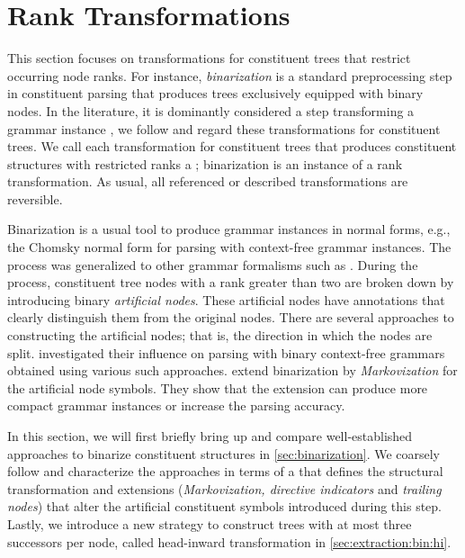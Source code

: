 \documentclass[../../document.tex]{subfiles}
\begin{document}
    \section{Rank Transformations}\label{sec:ranktransformations}
    This section focuses on transformations for constituent trees that restrict occurring node ranks.
    For instance, \emph{binarization} is a standard preprocessing step in constituent parsing that produces trees exclusively equipped with binary nodes.
    In the literature, it is dominantly considered a step transforming a grammar instance \citep[e.g.\@][]{KleMan03,Son08,Kal10}, we follow \citet{CraSchBod16} and regard these transformations for constituent trees.
    We call each transformation for constituent trees that produces constituent structures with restricted ranks a ; binarization is an instance of a rank transformation.
    As usual, all referenced or described transformations are reversible.

    Binarization is a usual tool to produce grammar instances in normal forms, e.g., the Chomsky normal form for parsing with context-free grammar instances.
    The process was generalized to other grammar formalisms such as  \citep{Kal10, Cra12}.
    During the process, constituent tree nodes with a rank greater than two are broken down by introducing binary \emph{artificial nodes}.
    These artificial nodes have annotations that clearly distinguish them from the original nodes.
    There are several approaches to constructing the artificial nodes; that is, the direction in which the nodes are split.
     investigated their influence on parsing with binary context-free grammars obtained using various such approaches.
     extend binarization by \emph{Markovization} for the artificial node symbols.
    They show that the extension can produce more compact grammar instances or increase the parsing accuracy.

    In this section, we will first briefly bring up and compare well-established approaches to binarize constituent structures in \cref{sec:binarization}.
    We coarsely follow \citet{Cra12} and characterize the approaches in terms of a  that defines the structural transformation and extensions (\emph{Markovization, directive indicators} and \emph{trailing nodes}) that alter the artificial constituent symbols introduced during this step.
    Lastly, we introduce a new strategy to construct trees with at most three successors per node, called head-inward transformation in \cref{sec:extraction:bin:hi}.
\end{document}
